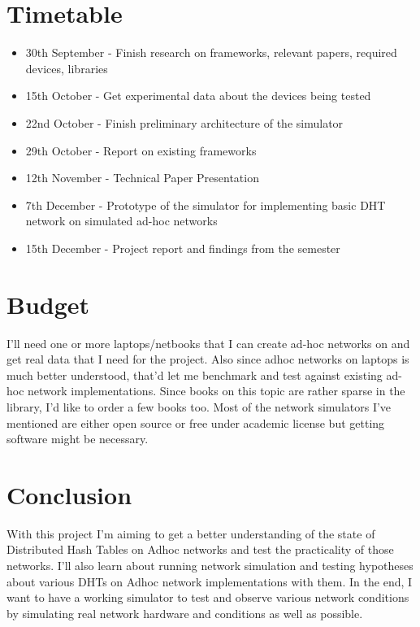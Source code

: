 \documentclass[a4paper,10pt]{article}
\begin{document}

\section*{Timetable}
\begin{itemize}
 \item 30th September - Finish research on frameworks, relevant papers, required devices, libraries
 \item 15th October - Get experimental data about the devices being tested
 \item 22nd October - Finish preliminary architecture of the simulator
 \item 29th October - Report on existing frameworks 
 \item 12th November - Technical Paper Presentation
 \item 7th December - Prototype of the simulator for implementing basic DHT network on simulated ad-hoc networks
 \item 15th December - Project report and findings from the semester
\end{itemize}

\section*{Budget}
I'll need one or more laptops/netbooks that I can create ad-hoc networks on and get real data that I need for the project. Also since adhoc networks on laptops is much better understood, that'd let me benchmark and test against existing ad-hoc network implementations. Since books on this topic are rather sparse in the library, I'd like to order a few books too. Most of the network simulators I've mentioned are either open source or free under academic license but getting software might be necessary.

\section*{Conclusion}
With this project I'm aiming to get a better understanding of the state of Distributed Hash Tables on Adhoc networks and test the practicality of those networks. I'll also learn about running network simulation and testing hypotheses about various DHTs on Adhoc network implementations with them. In the end, I want to have a working simulator to test and observe various network conditions by simulating real network hardware and conditions as well as possible.
{}

\end{document}
